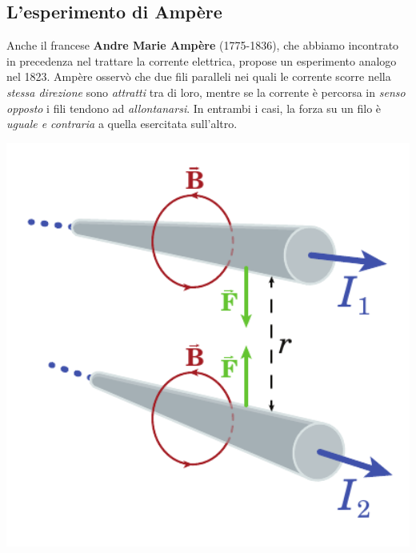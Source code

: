 \subsection{L'esperimento di Ampère}\label{EsperimentodiAmpere}
Anche il francese \textbf{Andre Marie Ampère} (1775-1836), che abbiamo incontrato in precedenza nel trattare la corrente elettrica, propose un esperimento analogo nel 1823. %
Ampère osservò che due fili paralleli nei quali le corrente scorre nella \textit{stessa direzione} sono \textit{attratti} tra di loro, mentre se la corrente è percorsa in \textit{senso opposto} i fili tendono ad \textit{allontanarsi}. In entrambi i casi, la forza su un filo è \textit{uguale e contraria} a quella esercitata sull'altro.\\
\begin{minipage}{0.49\textwidth}
	\begin{center}
		\includegraphics[width=1\textwidth]{images/chp7/chp7ampere1.pdf}
	\end{center}
\end{minipage}
